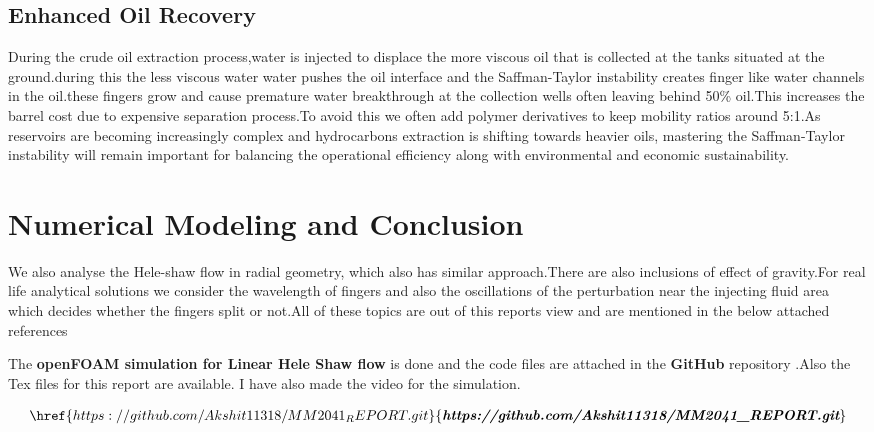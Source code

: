 \documentclass[12pt,a4paper]{article}
\begin{document}
\subsection{Enhanced Oil Recovery}
During the crude oil extraction process,water is injected to displace the more viscous oil that is collected at the tanks situated at the ground.during this the less viscous water water pushes the oil interface and the Saffman-Taylor instability creates finger like water channels in the oil.these fingers grow and cause premature water breakthrough at the collection wells often leaving behind 50\% oil.This increases the barrel cost due to expensive  separation process.To avoid this we often add polymer derivatives to keep mobility ratios around 5:1.As reservoirs  are becoming increasingly complex and hydrocarbons extraction is shifting towards heavier oils, mastering the Saffman-Taylor instability will remain important for balancing the operational efficiency along with environmental and economic sustainability.



\section{Numerical Modeling and Conclusion}

We also analyse the Hele-shaw flow in radial geometry, which also has similar approach.There are also inclusions of effect of gravity.For real life analytical solutions we consider the wavelength of fingers and also the oscillations of the perturbation near the injecting fluid area which decides whether the fingers split or not.All of these topics are out of this reports view and are mentioned in the below attached references

The \textbf{openFOAM simulation for Linear Hele Shaw flow} is done and the code files are attached in the \textbf{GitHub} repository .Also the Tex files for this report are available. I have also made the video for the simulation.

\begin{mdframed}[linewidth=0.5pt]
\begin{align}
  {\href{https://github.com/Akshit11318/MM2041_REPORT.git}{\textit{\textbf{https://github.com/Akshit11318/MM2041\_REPORT.git}}}}  
\end{align}
\end{mdframed}
\end{document}
